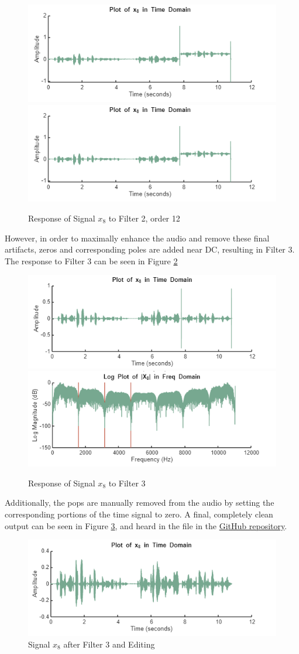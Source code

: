 \begin{figure}[H]
    \centering
    \includegraphics[width=0.5\linewidth]{figures/x8_filterv5.png}
    \includegraphics[width=0.5\linewidth]{figures/X8_filterv5.png}
    \caption{Response of Signal $x_8$ to Filter 2, order 12}
    \label{fig:x8_v5_response}
\end{figure}

However, in order to maximally enhance the audio and remove these final artifacts, zeros and corresponding poles are added near DC, resulting in Filter 3.  The response to Filter 3 can be seen in Figure \ref{fig:x8_14}

\begin{figure}[H]
    \centering
    \includegraphics[width=0.5\linewidth]{figures/x8_filter11.png}
    \includegraphics[width=0.5\linewidth]{figures/X8_filterv11.png}
    \caption{Response of Signal $x_8$ to Filter 3}
    \label{fig:x8_14}
\end{figure}

Additionally, the pops are manually removed from the audio by setting the corresponding portions of the time signal to zero.  A final, completely clean output can be seen in Figure \ref{fig:x8_clean}, and heard in the  file in the \href{https://github.com/dbcometto/ece434_cpx2}{GitHub repository}.

\begin{figure}[H]
    \centering
    \includegraphics[width=0.5\linewidth]{figures/x8_nopops.png}
    \caption{Signal $x_8$ after Filter 3 and Editing}
    \label{fig:x8_clean}
\end{figure}

